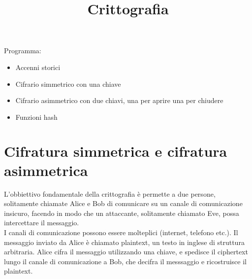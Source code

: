 \documentclass[11pt, oneside]{article}   	%
\title{Crittografia}
\date{}							%
\begin{document}
\maketitle
Programma:
\begin{itemize}
\item Accenni storici
\item Cifrario simmetrico con una chiave
\item Cifrario asimmetrico con due chiavi, una per aprire una per chiudere
\item Funzioni hash
\end{itemize}


\long{}

\section*{Cifratura simmetrica e cifratura asimmetrica}
L'obbiettivo fondamentale della crittografia è permette a due persone, solitamente chiamate Alice e Bob di comunicare su un canale di comunicazione insicuro, facendo in modo che un attaccante, solitamente chiamato Eve, possa intercettare il messaggio.\\
I canali di comunicazione possono essere molteplici (internet, telefono etc.). Il messaggio inviato da Alice è chiamato plaintext, un testo in inglese di struttura arbitraria. Alice cifra il messaggio utilizzando una chiave, e spedisce il ciphertext lungo il canale di comunicazione a Bob, che decifra il messsaggio e ricostruisce il plaintext.\\
\end{document}
